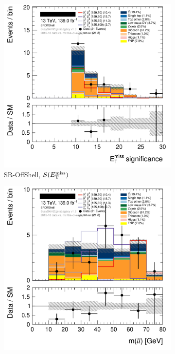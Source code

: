 \begin{figure}[tp]
\centering
\begin{subfigure}{0.495\textwidth}
\centering
\includegraphics[width=\textwidth]{figures/2ljets_def_met_Sign_SROffShell.png}
\caption{SR-OffShell, $S(E_\mathrm{T}^\mathrm{miss})$}
\end{subfigure}
\hfill
\begin{subfigure}{0.495\textwidth}
\centering
\includegraphics[width=\textwidth]{figures/2ljets_def_mll_SROffShell.png}

\end{subfigure}
\end{figure}
